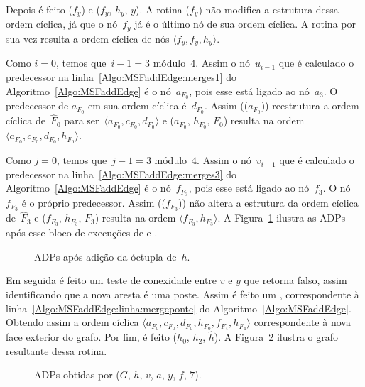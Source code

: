 Depois é feito \LCOCycle($f_y$) e \LCOMerge($f_y$, $h_y$, $y$).
A rotina \LCOCycle($f_y$) não modifica a estrutura dessa ordem cíclica, já que o nó~$f_y$ já é o último nó de sua ordem cíclica.
A rotina  por sua vez resulta a ordem cíclica de nós $\langle f_y, f_y, h_y \rangle$.

Como $i=0$, temos que~$i-1 = 3$ módulo~$4$.
Assim o nó~$u_{i-1}$ que é calculado o predecessor na linha~\ref{Algo:MSFaddEdge:merges1} do Algoritmo~\ref{Algo:MSFaddEdge} é o nó~$a_{F_0}$, pois esse está ligado ao nó~$a_3$.
O predecessor de $a_{F_0}$ em sua ordem cíclica é~$d_{F_0}$.
Assim \LCOCycle(\treapPredecessor($a_{F_0}$)) reestrutura a ordem cíclica de~$\hat F_0$ para ser~$\langle a_{F_0}, c_{F_0}, d_{F_0}\rangle$ e \LCOMerge($a_{F_0}$, $h_{F_0}$, $F_0$) resulta na ordem $\langle a_{F_0}, c_{F_0}, d_{F_0}, h_{F_0}\rangle$.

Como $j=0$, temos que~$j-1 = 3$ módulo~$4$.
Assim o nó~$v_{i-1}$ que é calculado o predecessor na linha~\ref{Algo:MSFaddEdge:merges3} do Algoritmo~\ref{Algo:MSFaddEdge} é o nó~$f_{F_3}$, pois esse está ligado ao nó~$f_3$.
O nó $f_{F_3}$ é o próprio predecessor.
Assim \LCOCycle(\treapPredecessor($f_{F_3}$)) não altera a estrutura da ordem cíclica de~$\hat F_3$ e \LCOMerge($f_{F_3}$, $h_{F_3}$, $F_3$) resulta na ordem $\langle  f_{F_3}, h_{F_3}\rangle$.
A Figura~\ref{fig:MSF-adiciona-ponte-2} ilustra as ADPs após esse bloco de execuções de \LCOCycle{} e \LCOMerge.

\begin{figure}[htb]
\scalebox{1}{

	}
\caption{ADPs após adição da óctupla de~$h$.}
\label{fig:MSF-adiciona-ponte-2}
\end{figure}

Em seguida é feito um teste de conexidade entre $v$ e $y$ que retorna falso, assim identificando que a nova aresta é uma poste.
Assim é feito um , correspondente à linha~\ref{Algo:MSFaddEdge:linha:mergeponte} do Algoritmo~\ref{Algo:MSFaddEdge}.
Obtendo assim a ordem cíclica $\langle a_{F_0}, c_{F_0}, d_{F_0}, h_{F_0}, f_{F_4}, h_{F_4}\rangle$ correspondente à nova face exterior do grafo.
Por fim, é feito \LCOMerge($h_0$, $h_2$, $\hat h$).
A Figura~\ref{fig:MSF-adiciona-ponte-3} ilustra o grafo resultante dessa rotina.


\begin{figure}[htb]
\scalebox{1}{

}
\caption{ADPs obtidas por \MSFaddEdge($G$, $h$, $v$, $a$, $y$, $f$, $7$).}
\label{fig:MSF-adiciona-ponte-3}
\end{figure}


